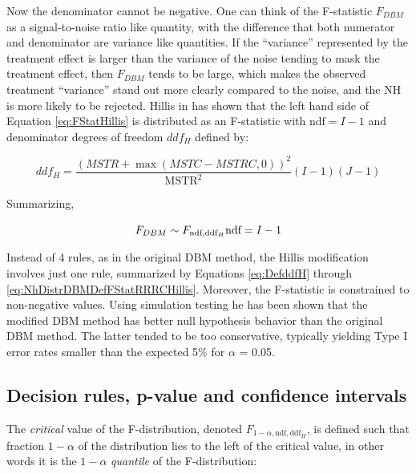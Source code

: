 \documentclass[
]{book}
\begin{document}
Now the denominator cannot be negative. One can think of the F-statistic \(F_{DBM}\) as a signal-to-noise ratio like quantity, with the difference that both numerator and denominator are variance like quantities. If the ``variance'' represented by the treatment effect is larger than the variance of the noise tending to mask the treatment effect, then \(F_{DBM}\) tends to be large, which makes the observed treatment ``variance'' stand out more clearly compared to the noise, and the NH is more likely to be rejected. Hillis in \citep{RN1772} has shown that the left hand side of Equation \eqref{eq:FStatHillis} is distributed as an F-statistic with \(\text{ndf} = I-1\) and denominator degrees of freedom \(ddf_H\) defined by:

\begin{equation}
ddf_H =\frac{\left ( MSTR + \max \left (MSTC - MSTRC,0  \right ) \right )^2}{\text{MSTR}^2}(I-1)(J-1)
\label{eq:DefddfH}
\end{equation}

Summarizing,

\begin{equation}
F_{DBM} \sim F_{\text{ndf},\text{ddf}_H} \\
\text{ndf}=I-1
\label{eq:NhDistrDBMDefFStatRRRCHillis}
\end{equation}

Instead of 4 rules, as in the original DBM method, the Hillis modification involves just one rule, summarized by Equations \eqref{eq:DefddfH} through \eqref{eq:NhDistrDBMDefFStatRRRCHillis}. Moreover, the F-statistic is constrained to non-negative values. Using simulation testing \citep{RN1866} he has been shown that the modified DBM method has better null hypothesis behavior than the original DBM method. The latter tended to be too conservative, typically yielding Type I error rates smaller than the expected 5\% for \(\alpha\) = 0.05.

\hypertarget{decision-rules-p-value-and-confidence-intervals}{%
\subsection{Decision rules, p-value and confidence intervals}\label{decision-rules-p-value-and-confidence-intervals}}

The \emph{critical} value of the F-distribution, denoted \(F_{1-\alpha,\text{ndf},\text{ddf}_H}\), is defined such that fraction \(1-\alpha\) of the distribution lies to the left of the critical value, in other words it is the \(1-\alpha\) \emph{quantile} of the F-distribution:
\end{document}
